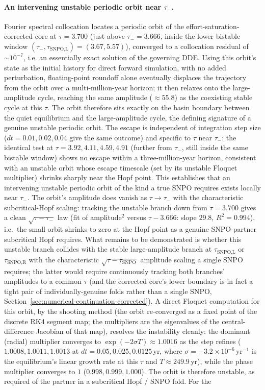 \documentclass[twocolumn,10pt]{article}
\begin{document}
\paragraph{An intervening unstable periodic orbit near $\tau_-$.} Fourier spectral collocation \cite{engelborghs2002} locates a periodic orbit of the effort-saturation-corrected core at $\tau=3.700$ (just above $\tau_-=3.666$, inside the lower bistable window $(\tau_-,\tau_{\text{SNPO,L}})=(3.67,5.57)$), converged to a collocation residual of $\sim10^{-7}$, i.e. an essentially exact solution of the governing DDE. Using this orbit's state as the initial history for direct forward simulation, with no added perturbation, floating-point roundoff alone eventually displaces the trajectory from the orbit over a multi-million-year horizon; it then relaxes onto the large-amplitude cycle, reaching the same amplitude ($\approx55.8$) as the coexisting stable cycle at this $\tau$. The orbit therefore sits exactly on the basin boundary between the quiet equilibrium and the large-amplitude cycle, the defining signature of a genuine unstable periodic orbit. The escape is independent of integration step size ($dt=0.01,0.02,0.04$ give the same outcome) and specific to $\tau$ near $\tau_-$: the identical test at $\tau=3.92,4.11,4.59,4.91$ (further from $\tau_-$, still inside the same bistable window) shows no escape within a three-million-year horizon, consistent with an unstable orbit whose escape timescale (set by its unstable Floquet multiplier) shrinks sharply near the Hopf point. This establishes that an intervening unstable periodic orbit of the kind a true SNPO requires exists locally near $\tau_-$. The orbit's amplitude does vanish as $\tau\to\tau_-$ with the characteristic subcritical-Hopf scaling: tracking the unstable branch down from $\tau=3.700$ gives a clean $\sqrt{\tau-\tau_-}$ law (fit of amplitude$^2$ versus $\tau-3.666$: slope $29.8$, $R^2=0.994$), i.e.\ the small orbit shrinks to zero at the Hopf point as a genuine SNPO-partner subcritical Hopf requires. What remains to be demonstrated is whether this unstable branch collides with the stable large-amplitude branch at $\tau_{\text{SNPO,L}}$ or $\tau_{\text{SNPO,R}}$ with the characteristic $\sqrt{\tau-\tau_{\text{SNPO}}}$ amplitude scaling a single SNPO requires; the latter would require continuously tracking both branches' amplitudes to a common $\tau$ (and the corrected core's lower boundary is in fact a tight pair of individually-genuine folds rather than a single SNPO, Section~\ref{sec:numerical-continuation-corrected}). A direct Floquet computation for this orbit, by the shooting method (the orbit re-converged as a fixed point of the discrete RK4 segment map; the multipliers are the eigenvalues of the central-difference Jacobian of that map), resolves the instability cleanly: the dominant (radial) multiplier converges to $\exp(-2\sigma T)\approx1.0016$ as the step refines ($1.0008,1.0011,1.0013$ at $dt=0.05,0.025,0.0125$\,yr, where $\sigma=-3.2\times10^{-6}$\,yr$^{-1}$ is the equilibrium's linear growth rate at this $\tau$ and $T\approx249.9$\,yr), while the phase multiplier converges to $1$ ($0.998,0.999,1.000$). The orbit is therefore unstable, as required of the partner in a subcritical Hopf / SNPO fold. For the 
\end{document}
